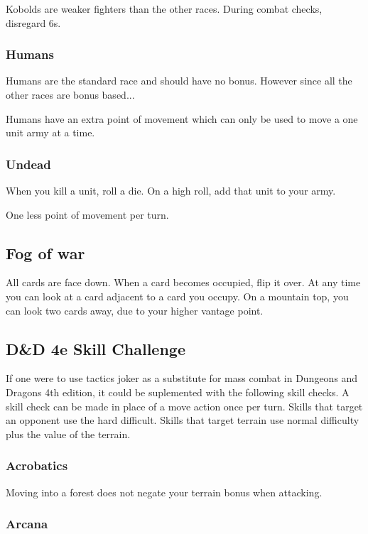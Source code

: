 \documentclass{article}
\begin{document}
Kobolds are weaker fighters than the other races.  During combat checks, disregard 6s.

\subsubsection{Humans}

Humans are the standard race and should have no bonus.  However since all the other races are bonus based...

Humans have an extra point of movement which can only be used to move a one unit army at a time.  

\subsubsection{Undead}

When you kill a unit, roll a die.  On a high roll, add that unit to your army.  

One less point of movement per turn.

\subsection{Fog of war}

All cards are face down.  When a card becomes occupied, flip it over.   At any time you can look at a card adjacent to a card you occupy.  On a mountain top, you can look two cards away, due to your higher vantage point.

\subsection{D\&D 4e Skill Challenge}

If one were to use tactics joker as a substitute for mass combat in Dungeons and Dragons 4th edition, it could be suplemented with the following skill checks.  A skill check can be made in place of a move action once per turn.  Skills that target an opponent use the hard difficult.  Skills that target terrain use normal difficulty plus the value of the terrain.

\subsubsection{Acrobatics}

Moving into a forest does not negate your terrain bonus when attacking.

\subsubsection{Arcana}
\end{document}
